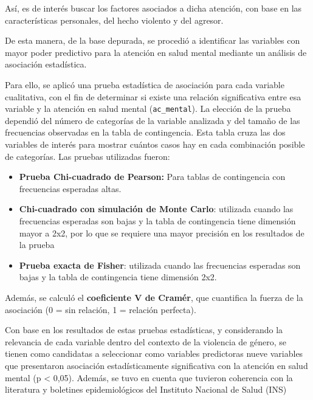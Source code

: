 \documentclass[
]{article}
\begin{document}
Así, es de interés buscar los factores asociados a dicha atención, con
base en las características personales, del hecho violento y del
agresor.

De esta manera, de la base depurada, se procedió a identificar las
variables con mayor poder predictivo para la atención en salud mental
mediante un análisis de asociación estadística.

Para ello, se aplicó una prueba estadística de asociación para cada
variable cualitativa, con el fin de determinar si existe una relación
significativa entre esa variable y la atención en salud mental
(\texttt{ac\_mental}). La elección de la prueba dependió del número de
categorías de la variable analizada y del tamaño de las frecuencias
observadas en la tabla de contingencia. Esta tabla cruza las dos
variables de interés para mostrar cuántos casos hay en cada combinación
posible de categorías. Las pruebas utilizadas fueron:

\begin{itemize}
\item
  \textbf{Prueba Chi-cuadrado de Pearson:} Para tablas de contingencia
  con frecuencias esperadas altas.
\item
  \textbf{Chi-cuadrado con simulación de Monte Carlo}: utilizada cuando
  las frecuencias esperadas son bajas y la tabla de contingencia tiene
  dimensión mayor a 2x2, por lo que se requiere una mayor precisión en
  los resultados de la prueba
\item
  \textbf{Prueba exacta de Fisher}: utilizada cuando las frecuencias
  esperadas son bajas y la tabla de contingencia tiene dimensión 2x2.
\end{itemize}

Además, se calculó el \textbf{coeficiente V de Cramér}, que cuantifica
la fuerza de la asociación (0 = sin relación, 1 = relación perfecta).

Con base en los resultados de estas pruebas estadísticas, y considerando
la relevancia de cada variable dentro del contexto de la violencia de
género, se tienen como candidatas a seleccionar como variables
predictoras nueve variables que presentaron asociación estadísticamente
significativa con la atención en salud mental (p \textless{} 0,05).
Además, se tuvo en cuenta que tuvieron coherencia con la literatura y
boletines epidemiológicos del Instituto Nacional de Salud (INS)
\end{document}
